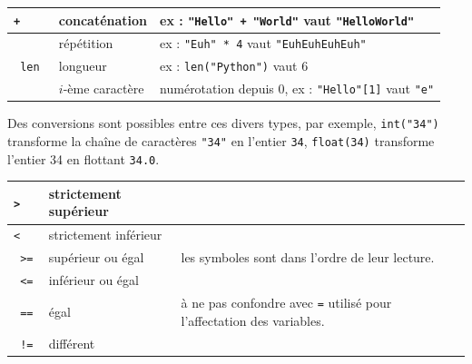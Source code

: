 \documentclass[11pt,a4paper]{article}
\begin{document}
\begin{tcolorbox}[left=0cm,title=\bf{\faPython \; Types de base et opérateurs associés},colbacktitle=cfond]
\begin{itemize}
	\begin{tabularx}{\linewidth}{|>{\tt}l|l|X|}
		\hline
		+ & concaténation & ex : {\tt "Hello" + "World"} vaut {\tt "HelloWorld"}\\
		\hline
		* & répétition & ex : {\tt "Euh" * 4} vaut {\tt "EuhEuhEuhEuh"} \\
		\hline
		len & longueur & ex : {\tt len("Python")} vaut 6 \\
		\hline
		[] & $i$-ème caractère & numérotation depuis 0, ex : {\tt "Hello"[1]} vaut {\tt "e"}\\
		\hline
	 \end{tabularx}
\end{itemize}
Des conversions sont possibles entre ces divers types, par exemple, \texttt{int("34")} transforme la chaîne de caractères {\tt "34"} en l'entier {\tt 34}, \texttt{float(34)} transforme l'entier 34 en flottant {\tt 34.0}.
\end{tcolorbox}

\begin{tcolorbox}[left=0cm,title=\bf{\faPython \; Comparaison},colbacktitle=cfond]
	\begin{tabularx}{\linewidth}{|>{\tt}l|l|X|}
		\hline
		> & strictement supérieur & \\
		\hline
		< & strictement inférieur & \\
		\hline
		>= & supérieur ou égal & les symboles sont dans l'ordre de leur lecture.\\
		\hline
		<= & inférieur ou égal & \\
		\hline
		== & égal & {\small \danger} à ne pas confondre avec {\tt =} utilisé pour l'affectation des variables. \\
		\hline
		!= & différent & \\
		\hline
	\end{tabularx}
\end{tcolorbox}
\end{document}
